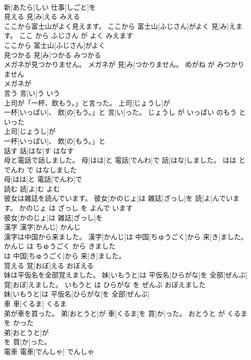 \documentclass[8pt]{extreport}
\begin{document}
\begin{CJK}{UTF8}{min}
\\	新[あたら]しい 仕事[しごと]を
\\	見える	見[み]える	みえる	
\\	ここから富士山がよく見えます。	ここから 富士山[ふじさん]がよく 見[み]えます。	ここ から ふじさん が よく みえます	
\\	ここから 富士山[ふじさん]がよく
\\	見つかる	見[み]つかる	みつかる	
\\	メガネが見つかりません。	メガネが 見[み]つかりません。	めがね が みつかりません	
\\	メガネが
\\	言う	言[い]う	いう	
\\	上司が「一杯、飲もう。」と言った。	上司[じょうし]が
\\	一杯[いっぱい]、 飲[の]もう。」と 言[い]った。	じょうし が いっぱい のもう と いった	
\\	上司[じょうし]が
\\	一杯[いっぱい]、 飲[の]もう。」と
\\	話す	話[はな]す	はなす	
\\	母と電話で話しました。	母[はは]と 電話[でんわ]で 話[はな]しました。	はは と でんわ で はなしました	
\\	母[はは]と 電話[でんわ]で
\\	読む	読[よ]む	よむ	
\\	彼女は雑誌を読んでいます。	彼女[かのじょ]は 雑誌[ざっし]を 読[よ]んでいます。	かのじょ は ざっし を よんで います	
\\	彼女[かのじょ]は 雑誌[ざっし]を
\\	漢字	漢字[かんじ]	かんじ	
\\	漢字は中国から来ました。	漢字[かんじ]は 中国[ちゅうごく]から 来[き]ました。	かんじ は ちゅうごく から きました	
\\	は 中国[ちゅうごく]から 来[き]ました。			
\\	覚える	覚[おぼ]える	おぼえる	
\\	妹は平仮名を全部覚えました。	妹[いもうと]は 平仮名[ひらがな]を 全部[ぜんぶ] 覚[おぼ]えました。	いもうと は ひらがな を ぜんぶ おぼえました	
\\	妹[いもうと]は 平仮名[ひらがな]を 全部[ぜんぶ]
\\	車	車[くるま]	くるま	
\\	弟が車を買った。	弟[おとうと]が 車[くるま]を 買[か]った。	おとうと が くるま を かった	
\\	弟[おとうと]が
\\	を 買[か]った。			
\\	電車	電車[でんしゃ]	でんしゃ	

\end{CJK}
\end{document}

